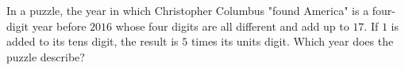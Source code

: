 In a puzzle, the year in which Christopher Columbus "found America" is a four-digit year before $2016$ whose four digits are all different and add up to $17$. If $1$ is added to its tens digit, the result is $5$ times its units digit. Which year does the puzzle describe?
